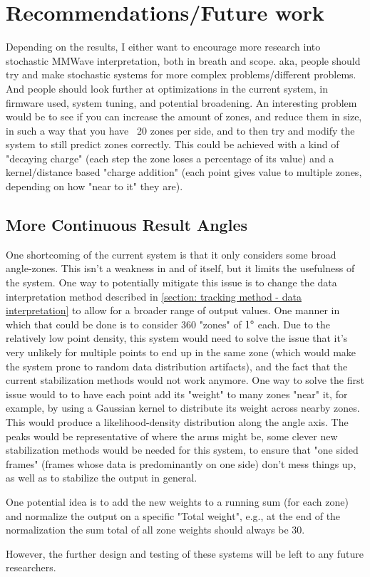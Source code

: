 \section{Recommendations/Future work}
\label{section: conclusion - future work}
Depending on the results, I either want to encourage more research into stochastic MMWave interpretation, both in breath and scope. aka, people should try and make stochastic systems for more complex problems/different problems. And people should look further at optimizations in the current system, in firmware used, system tuning, and potential broadening.
An interesting problem would be to see if you can increase the amount of zones, and reduce them in size, in such a way that you have ~20 zones per side, and to then try and modify the system to still predict zones correctly.
This could be achieved with a kind of "decaying charge" (each step the zone loses a percentage of its value) and a kernel/distance based "charge addition" (each point gives value to multiple zones, depending on how "near to it" they are).


\subsection{More Continuous Result Angles}
One shortcoming of the current system is that it only considers some broad angle-zones.
This isn't a weakness in and of itself, but it limits the usefulness of the system.
One way to potentially mitigate this issue is to change the data interpretation method described in \cref{section: tracking method - data interpretation} to allow for a broader range of output values.
One manner in which that could be done is to consider 360 "zones" of $1\degree$ each. 
Due to the relatively low point density, this system would need to solve the issue that it's very unlikely for multiple points to end up in the same zone (which would make the system prone to random data distribution artifacts), and the fact that the current stabilization methods would not work anymore.
One way to solve the first issue would to to have each point add its "weight" to many zones "near" it, for example, by using a Gaussian kernel to distribute its weight across nearby zones.
This would produce a likelihood-density distribution along the angle axis.
The peaks would be representative of where the arms might be, some clever new stabilization methods would be needed for this system, to ensure that "one sided frames" (frames whose data is predominantly on one side) don't mess things up, as well as to stabilize the output in general.

One potential idea is to add the new weights to a running sum (for each zone) and normalize the output on a specific "Total weight", e.g., at the end of the normalization the sum total of all zone weights should always be 30.

However, the further design and testing of these systems will be left to any future researchers.